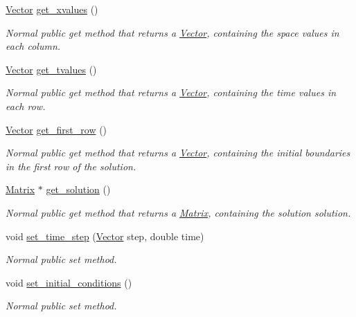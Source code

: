 \begin{DoxyCompactItemize}
\hyperlink{classVector}{Vector} \hyperlink{classProblem_a24f804792a0f5e30816a79cbbdb4c561}{get\+\_\+xvalues} ()
\begin{DoxyCompactList}\small\item\em Normal public get method that returns a \hyperlink{classVector}{Vector}, containing the space values in each column. \end{DoxyCompactList}\item 
\hyperlink{classVector}{Vector} \hyperlink{classProblem_ad9471629841ec6bd734d398ed9bfa624}{get\+\_\+tvalues} ()
\begin{DoxyCompactList}\small\item\em Normal public get method that returns a \hyperlink{classVector}{Vector}, containing the time values in each row. \end{DoxyCompactList}\item 
\hyperlink{classVector}{Vector} \hyperlink{classProblem_af17e4443d0bf9b347f5d2765eb235412}{get\+\_\+first\+\_\+row} ()
\begin{DoxyCompactList}\small\item\em Normal public get method that returns a \hyperlink{classVector}{Vector}, containing the initial boundaries in the first row of the solution. \end{DoxyCompactList}\item 
\hyperlink{classMatrix}{Matrix} $\ast$ \hyperlink{classProblem_ac4e50f2308eef0abbe17446a9763b5be}{get\+\_\+solution} ()
\begin{DoxyCompactList}\small\item\em Normal public get method that returns a \hyperlink{classMatrix}{Matrix}, containing the solution solution. \end{DoxyCompactList}\item 
void \hyperlink{classProblem_ac383070ca94c0da306bbcfbde061183a}{set\+\_\+time\+\_\+step} (\hyperlink{classVector}{Vector} step, double time)
\begin{DoxyCompactList}\small\item\em Normal public set method. \end{DoxyCompactList}\item 
void \hyperlink{classProblem_a3bc203645a0d259f21586b55d239ee88}{set\+\_\+initial\+\_\+conditions} ()
\begin{DoxyCompactList}\small\item\em Normal public set method. \end{DoxyCompactList}\end{DoxyCompactItemize}
